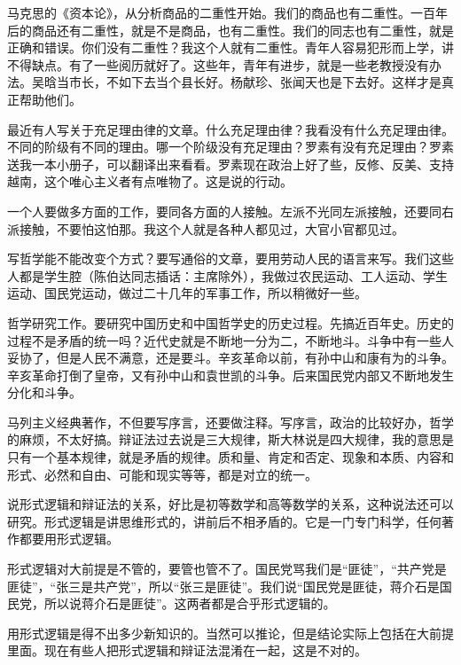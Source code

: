 马克思的《资本论》，从分析商品的二重性开始。我们的商品也有二重性。一百年后的商品还有二重性，就是不是商品，也有二重性。我们的同志也有二重性，就是正确和错误。你们没有二重性？我这个人就有二重性。青年人容易犯形而上学，讲不得缺点。有了一些阅历就好了。这些年，青年有进步，就是一些老教授没有办法。吴晗当市长，不如下去当个县长好。杨献珍、张闻天也是下去好。这样才是真正帮助他们。

最近有人写关于充足理由律的文章。什么充足理由律？我看没有什么充足理由律。不同的阶级有不同的理由。哪一个阶级没有充足理由？罗素有没有充足理由？罗素送我一本小册子，可以翻译出来看看。罗素现在政治上好了些，反修、反美、支持越南，这个唯心主义者有点唯物了。这是说的行动。

一个人要做多方面的工作，要同各方面的人接触。左派不光同左派接触，还要同右派接触，不要怕这怕那。我这个人就是各种人都见过，大官小官都见过。

写哲学能不能改变个方式？要写通俗的文章，要用劳动人民的语言来写。我们这些人都是学生腔（陈伯达同志插话：主席除外），我做过农民运动、工人运动、学生运动、国民党运动，做过二十几年的军事工作，所以稍微好一些。

哲学研究工作。要研究中国历史和中国哲学史的历史过程。先搞近百年史。历史的过程不是矛盾的统一吗？近代史就是不断地一分为二，不断地斗。斗争中有一些人妥协了，但是人民不满意，还是要斗。辛亥革命以前，有孙中山和康有为的斗争。辛亥革命打倒了皇帝，又有孙中山和袁世凯的斗争。后来国民党内部又不断地发生分化和斗争。

马列主义经典著作，不但要写序言，还要做注释。写序言，政治的比较好办，哲学的麻烦，不太好搞。辩证法过去说是三大规律，斯大林说是四大规律，我的意思是只有一个基本规律，就是矛盾的规律。质和量、肯定和否定、现象和本质、内容和形式、必然和自由、可能和现实等等，都是对立的统一。

说形式逻辑和辩证法的关系，好比是初等数学和高等数学的关系，这种说法还可以研究。形式逻辑是讲思维形式的，讲前后不相矛盾的。它是一门专门科学，任何著作都要用形式逻辑。

形式逻辑对大前提是不管的，要管也管不了。国民党骂我们是“匪徒”，“共产党是匪徒”，“张三是共产党”，所以“张三是匪徒”。我们说“国民党是匪徒，蒋介石是国民党，所以说蒋介石是匪徒”。这两者都是合乎形式逻辑的。

用形式逻辑是得不出多少新知识的。当然可以推论，但是结论实际上包括在大前提里面。现在有些人把形式逻辑和辩证法混淆在一起，这是不对的。


